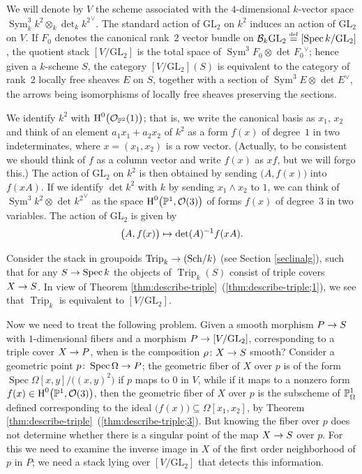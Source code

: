 \documentclass{amsart}
\numberwithin{equation}{section}
\numberwithin{subsection}{section}
\theoremstyle{definition}
\theoremstyle{remark}
\newcommand\refall[2]{\ref{#1}~(\ref{#1;#2})}
\newcommand\cO{\mathcal{O}} \newcommand\cP{\mathcal{P}}
\newcommand\arr{\ifinner\to\else\longrightarrow\fi}
\newcommand\arrto{\ifinner\mapsto\else\longmapsto\fi}
\renewcommand\H{\operatorname{H}}
\newcommand\eqdef{\overset{\mathrm{\scriptscriptstyle def}} =}
\newcommand\spec{\operatorname{Spec}}
\newcommand{\catsch}[1]{(\mathrm{Sch}/#1)}
\newcommand{\trip}{\operatorname{Trip}}
\newcommand{\GL}{\mathrm{GL}}
\newcommand{\sym}{\operatorname{Sym}}
\newcommand{\symthree}[2][]{\sym^{3}_{{#1}}{#2} \otimes_{{#1}} \det\nolimits_{{#1}} {#2}\dual}
\newcommand{\dual}{^{\vee}}
\begin{document}
We will denote by $V$ the scheme associated with the $4$-dimensional $k$-vector space $\symthree[k]{k^{2}}$. The standard action of $\GL_{2}$ on $k^{2}$ induces an action of $\GL_{2}$ on $V$. If $F_{0}$ denotes the canonical rank~$2$ vector bundle on $\cB_{k}\GL_{2} \eqdef [\spec k/ \GL_{2}]$, the quotient stack $[V/\GL_{2}]$ is the total space of $\symthree{F_{0}}$; hence given a $k$-scheme $S$, the category $[V/\GL_{2}](S)$ is equivalent to the category of rank~$2$ locally free sheaves $E$ on $S$, together with a section of $\symthree{E}$, the arrows being isomorphisms of locally free sheaves preserving the sections.

We identify $k^{2}$ with $\H^{0}\bigl(\cO_{\PP^{2}}(1)\bigr)$; that is, we write the canonical basis as $x_{1}$, $x_{2}$ and think of an element $a_{1}x_{1} + a_{2}x_{2}$ of $k^{2}$ as a form $f(x)$ of degree~$1$ in two indeterminates, where $x=(x_1,x_2)$ is a row vector. (Actually, to be consistent we should think of $f$ as a column vector and write $f(x)$ as $xf$, but we will forgo this.) The action of $\GL_{2}$ on $k^{2}$ is then obtained by sending $\bigl(A,f(x)\bigr)$ into $f(xA)$. If we identify $\det k^{2}$ with $k$ by sending $x_{1} \wedge x_{2}$ to $1$, we can think of $\symthree{k^{2}}$ as the space $\H^{0}\bigl(\PP^{1}, \cO(3)\bigr)$ of forms $f(x)$ of degree~$3$ in two variables. The action of $\GL_{2}$ is given by
   \[
   \bigl(A,f(x)\bigr) \arrto \det(A)^{-1}f(xA).
   \]

Consider the stack in groupoids $\trip_{k} \arr \catsch{k}$ (see Section \ref{seclinalg}), such that for any $S \arr \spec k$ the objects of $\trip_{k}(S)$ consist of triple covers $X \arr S$. In view of Theorem \refall{thm:describe-triple}{1}, we see that $\trip_{k}$ is equivalent to $[V/\GL_{2}]$.

Now we need to treat the following problem. Given a smooth morphism $P \arr S$ with $1$-dimensional fibers and a morphism $P \arr [V/\GL_{2}]$, corresponding to a triple cover $X \arr P$, when is the composition $\rho\colon X \arr S$ smooth? Consider a geometric point $p\colon \spec\Omega \arr P$; the geometric fiber of $X$ over $p$ is of the form $\spec\Omega[x,y]/\bigl((x,y)^{2}\bigr)$ if $p$ maps to $0$ in $V$, while if it maps to a nonzero form $f(x) \in \H^{0}\bigl(\PP^{1}, \cO(3)\bigr)$, then the geometric fiber of $X$ over $p$ is the subscheme of $\mathbb{P}^{1}_{\Omega}$ defined corresponding to the ideal $\bigl(f(x)\bigr) \subseteq \Omega[x_{1}, x_{2}]$, by Theorem \refall{thm:describe-triple}{3}. But knowing the fiber over $p$ does not determine whether there is a singular point of the map $X \arr S$ over $p$. For this we need to examine the inverse image in $X$ of the first order neighborhood of $p$ in $P$; we need a stack lying over $[V/\GL_{2}]$ that detects this information.
\end{document}
